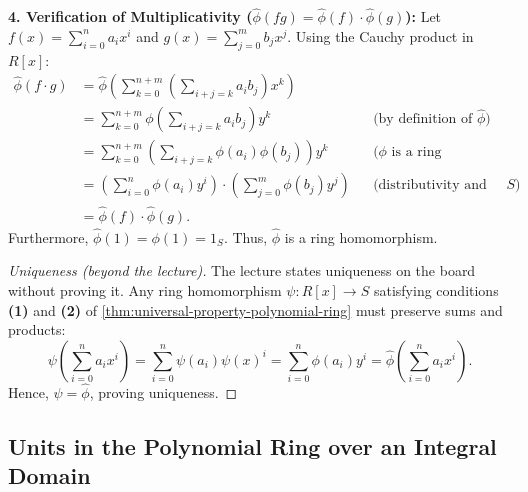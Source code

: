 \begin{proofWrapper}
\begin{content}
\textbf{4. Verification of Multiplicativity ($\hat{\phi}(fg) = \hat{\phi}(f) \cdot \hat{\phi}(g)$):}
Let $f(x) = \sum_{i=0}^n a_i x^i$ and $g(x) = \sum_{j=0}^m b_j x^j$. Using the Cauchy product in $R[x]$:
\begin{align}
    \hat{\phi}(f \cdot g) &= \hat{\phi}\left( \sum_{k=0}^{n+m} \left( \sum_{i+j=k} a_i b_j \right) x^k \right) \nonumber \\
    &= \sum_{k=0}^{n+m} \phi\left( \sum_{i+j=k} a_i b_j \right) y^k && \text{(by definition of $\hat{\phi}$)} \nonumber \\
    &= \sum_{k=0}^{n+m} \left( \sum_{i+j=k} \phi(a_i) \phi(b_j) \right) y^k && \text{($\phi$ is a ring homomorphism)} \nonumber \\
    &= \left( \sum_{i=0}^n \phi(a_i) y^i \right) \cdot \left( \sum_{j=0}^m \phi(b_j) y^j \right) && \text{(distributivity and commutativity in $S$)} \nonumber \\
    &= \hat{\phi}(f) \cdot \hat{\phi}(g). \label{eq:multiplicativity-check}
\end{align}
Furthermore, $\hat{\phi}(1) = \phi(1) = 1_S$. Thus, $\hat{\phi}$ is a ring homomorphism.

\begin{proof}[Uniqueness (beyond the lecture)]
The lecture states uniqueness on the board without proving it. Any ring homomorphism $\psi \colon R[x] \to S$ satisfying conditions \textbf{(1)} and \textbf{(2)} of \cref{thm:universal-property-polynomial-ring} must preserve sums and products:
\[
\psi\left( \sum_{i=0}^n a_i x^i \right) = \sum_{i=0}^n \psi(a_i) \psi(x)^i = \sum_{i=0}^n \phi(a_i) y^i = \hat{\phi}\left( \sum_{i=0}^n a_i x^i \right).
\]
Hence, $\psi = \hat{\phi}$, proving uniqueness.
\end{proof}
\end{content}

\end{proofWrapper}

\subsection{Units in the Polynomial Ring over an Integral Domain}

